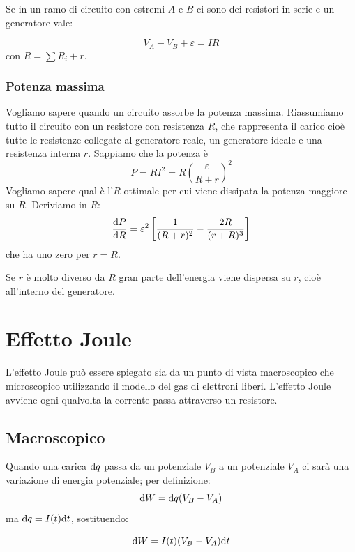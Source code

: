 Se in un ramo di circuito con estremi $A$ e $B$ ci sono dei resistori in serie e un generatore vale:
\begin{legge}
\begin{equation}
V_A-V_B+\varepsilon=IR
\label{Ohm_gen}
\end{equation}
con $R=\sum R_i+r$.
\end{legge}
\subsubsection{Potenza massima}
Vogliamo sapere quando un circuito assorbe la potenza massima. Riassumiamo tutto il circuito con un resistore con resistenza $R$, che rappresenta il carico cioè tutte le resistenze collegate al generatore reale, un generatore ideale e una resistenza interna $r$. Sappiamo che la potenza è 
\begin{equation*}P=RI^2=R\left(\frac{\varepsilon}{R+r}\right)^2\end{equation*}
Vogliamo sapere qual è l'$R$ ottimale per cui viene dissipata la potenza maggiore su $R$. Deriviamo in $R$:
\begin{equation*}\frac{\mathrm{d} P}{\mathrm{d} R}=\varepsilon^2\left[\frac{1}{(R+r)^2}-\frac{2R}{(r+R)^3}\right]\end{equation*}
che ha uno zero per $r=R$.

Se $r$ è molto diverso da $R$ gran parte dell'energia viene dispersa su $r$, cioè all'interno del generatore.

\section{Effetto Joule}
L'effetto Joule può essere spiegato sia da un punto di vista macroscopico che microscopico utilizzando il modello del gas di elettroni liberi. L'effetto Joule avviene ogni qualvolta la corrente passa attraverso un resistore.
\subsection{Macroscopico}
Quando una carica $\mathrm{d} q$ passa da un potenziale $V_B$ a un potenziale $V_A$ ci sarà una variazione di energia potenziale; per definizione:
\begin{equation*}\mathrm{d} W=\mathrm{d} q(V_B-V_A)\end{equation*}
ma $\mathrm{d} q=I(t)\mathrm{d} t$, sostituendo:
\begin{legge}
\begin{equation}
\mathrm{d} W=I(t)(V_B-V_A)\mathrm{d} t
\end{equation}
\end{legge}

